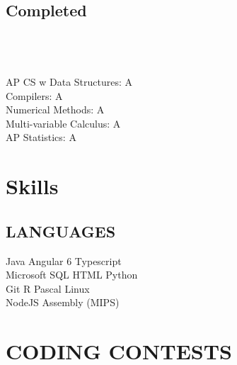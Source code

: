 \documentclass[]{deedy-resume-openfont}
\begin{document}
\begin{minipage}[t]{0.3\textwidth}
\subsection{Completed}
\\
\\
\\
\textbullet{} AP CS w Data Structures: A \\
\textbullet{} Compilers: A \\
\textbullet{} Numerical Methods: A \\
\textbullet{} Multi-variable Calculus: A \\
\textbullet{} AP Statistics: A \\
\sectionsep

\vspace{1.5cm}

\section{Skills}
\subsection{LANGUAGES}
Java \textbullet{}Angular 6 \textbullet{} Typescript \\
Microsoft SQL \textbullet{} HTML \textbullet{}Python \\
Git \textbullet{} R \textbullet{} Pascal \textbullet{} Linux \\ 
NodeJS \textbullet{} Assembly (MIPS) 

\vspace{1.5cm}
\section{CODING CONTESTS}

\sectionsep

\sectionsep



%
%

\end{minipage} 
\end{document}
